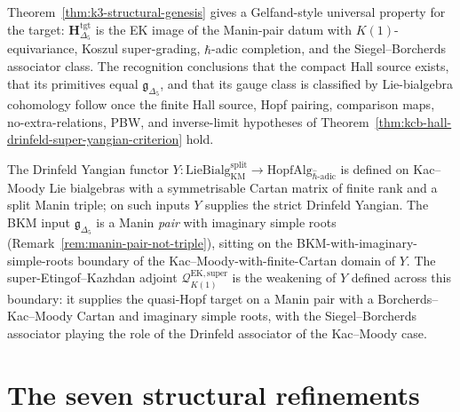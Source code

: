\begin{remark}
\label{rem:k3-gelfand-universal-property}
Theorem~\ref{thm:k3-structural-genesis} gives a Gelfand-style universal
property for the target: $\mathbf{H}_{\Delta_5}^{\mathrm{tgt}}$ is the
EK image of the Manin-pair datum with $K(1)$-equivariance, Koszul
super-grading, $\widehat{\hbar}$-adic completion, and the
Siegel--Borcherds associator class. The recognition conclusions that
the compact Hall source exists, that its primitives equal
$\mathfrak{g}_{\Delta_5}$, and that its gauge class is classified by
Lie-bialgebra cohomology follow once the finite Hall source, Hopf
pairing, comparison maps, no-extra-relations, PBW, and inverse-limit
hypotheses of
Theorem~\ref{thm:kcb-hall-drinfeld-super-yangian-criterion} hold.
\end{remark}

\begin{remark}
\label{rem:k3-non-yangian-adjoint}
The Drinfeld Yangian functor $Y\colon \mathrm{LieBialg}_{\mathrm{KM}}^{\mathrm{split}}
\to \mathrm{HopfAlg}_{\widehat{\hbar}\text{-adic}}$ is defined on Kac--Moody Lie
bialgebras with a symmetrisable Cartan matrix of finite rank and a split Manin
triple; on such inputs $Y$ supplies the strict Drinfeld Yangian. The BKM input
$\mathfrak{g}_{\Delta_5}$ is a Manin \emph{pair} with imaginary simple roots
(Remark~\ref{rem:manin-pair-not-triple}), sitting on the BKM-with-imaginary-simple-roots
boundary of the Kac--Moody-with-finite-Cartan domain of $Y$. The
super-Etingof--Kazhdan adjoint
$\mathcal{Q}^{\mathrm{EK,super}}_{K(1)}$ is the weakening of $Y$ defined
across this boundary: it supplies the quasi-Hopf target on a Manin pair with a
Borcherds--Kac--Moody Cartan and imaginary simple roots, with the Siegel--Borcherds
associator playing the role of the Drinfeld associator of the Kac--Moody case.
\end{remark}

\section{The seven structural refinements}
\label{sec:k3-platonic-overture}


